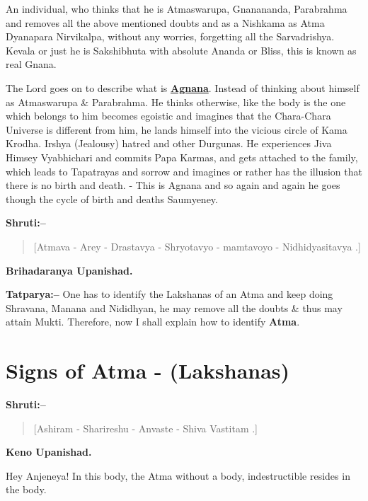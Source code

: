 An individual, who thinks that he is Atmaswarupa, Gnanananda, Parabrahma and removes all the above mentioned doubts and as a Nishkama as Atma Dyanapara Nirvikalpa, without any worries, forgetting all the Sarvadrishya. Kevala or just he is Sakshibhuta with absolute Ananda or Bliss, this is known as real Gnana.

The Lord goes on to describe what is \textbf{\underline{Agnana}}. Instead of thinking about himself as Atmaswarupa \& Parabrahma. He thinks otherwise, like the body is the one which belongs to him becomes egoistic and imagines that the Chara-Chara Universe is different from him, he lands himself into the vicious circle of Kama Krodha. Irshya (Jealousy) hatred and other Durgunas. He experiences Jiva Himsey Vyabhichari and commits Papa Karmas, and gets attached to the family, which leads to Tapatrayas and sorrow and imagines or rather has the illusion that there is no birth and death. - This is Agnana and so again and again he goes though the cycle of birth and deaths Saumyeney.

\textbf{Shruti:–}

\begin{verse}
[Atmava - Arey - Drastavya - Shryotavyo - mamtavoyo - Nidhidyasitavya .]
\end{verse}

\begin{flushright}
\textbf{Brihadaranya Upanishad.}
\end{flushright}

\textbf{Tatparya:–} One has to identify the Lakshanas of an Atma and keep doing Shravana, Manana and Nididhyan, he may remove all the doubts \& thus may attain Mukti. Therefore, now I shall explain how to identify \textbf{Atma}.

\chapter{Signs of Atma - (Lakshanas)}

\textbf{Shruti:–}

\begin{verse}
[Ashiram - Sharireshu - Anvaste - Shiva Vastitam .]
\end{verse}

\begin{flushright}
\textbf{Keno Upanishad.}
\end{flushright}

Hey Anjeneya! In this body, the Atma without a body, indestructible resides in the body.

